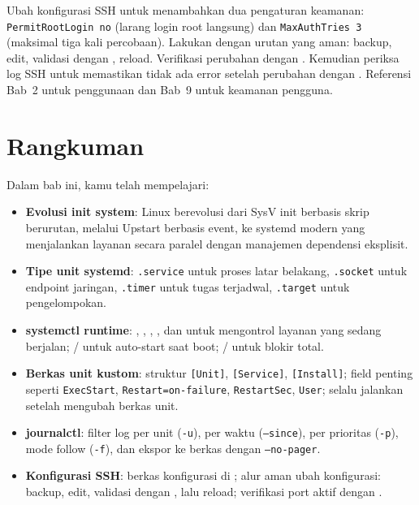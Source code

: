 \begin{challengebox}
Ubah konfigurasi SSH untuk menambahkan dua pengaturan keamanan: \texttt{PermitRootLogin no} (larang login root langsung) dan \texttt{MaxAuthTries 3} (maksimal tiga kali percobaan). Lakukan dengan urutan yang aman: backup, edit, validasi dengan , reload. Verifikasi perubahan dengan . Kemudian periksa log SSH untuk memastikan tidak ada error setelah perubahan dengan . Referensi Bab~2 untuk penggunaan  dan Bab~9 untuk keamanan pengguna.
\end{challengebox}

\section{Rangkuman}
\label{sec:service-summary}

Dalam bab ini, kamu telah mempelajari:

\begin{itemize}[noitemsep,topsep=2pt]
    \item \textbf{Evolusi init system}: Linux berevolusi dari SysV init berbasis skrip berurutan, melalui Upstart berbasis event, ke systemd modern yang menjalankan layanan secara paralel dengan manajemen dependensi eksplisit.
    \item \textbf{Tipe unit systemd}: \texttt{.service} untuk proses latar belakang, \texttt{.socket} untuk endpoint jaringan, \texttt{.timer} untuk tugas terjadwal, \texttt{.target} untuk pengelompokan.
    \item \textbf{systemctl runtime}: , , , , dan  untuk mengontrol layanan yang sedang berjalan; / untuk auto-start saat boot; / untuk blokir total.
    \item \textbf{Berkas unit kustom}: struktur \texttt{[Unit]}, \texttt{[Service]}, \texttt{[Install]}; field penting seperti \texttt{ExecStart}, \texttt{Restart=on-failure}, \texttt{RestartSec}, \texttt{User}; selalu jalankan  setelah mengubah berkas unit.
    \item \textbf{journalctl}: filter log per unit (\texttt{-u}), per waktu (\texttt{--since}), per prioritas (\texttt{-p}), mode follow (\texttt{-f}), dan ekspor ke berkas dengan \texttt{--no-pager}.
    \item \textbf{Konfigurasi SSH}: berkas konfigurasi di ; alur aman ubah konfigurasi: backup, edit, validasi dengan , lalu reload; verifikasi port aktif dengan .
\end{itemize}

